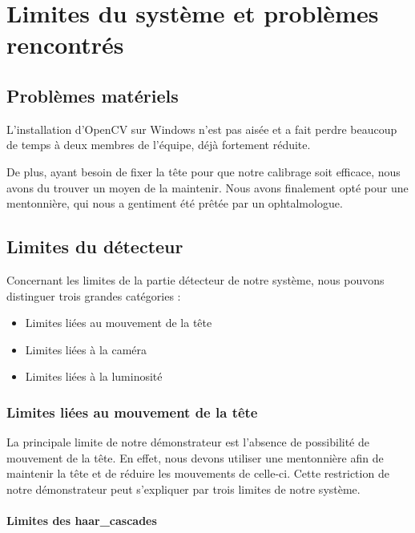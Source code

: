 \section{Limites du système et problèmes rencontrés}

\subsection{Problèmes matériels}
L'installation d'OpenCV sur Windows n'est pas aisée et a fait perdre beaucoup de temps à deux membres de l'équipe, déjà fortement réduite.

De plus, ayant besoin de fixer la tête pour que notre calibrage soit efficace, nous avons du trouver un moyen de la maintenir. Nous avons finalement opté pour une mentonnière, qui nous a gentiment été prêtée par un ophtalmologue.

\subsection{Limites du détecteur}

Concernant les limites de la partie détecteur de notre système, nous pouvons distinguer trois grandes catégories :
\begin{itemize}[font=\tiny, label=]
\item Limites liées au mouvement de la tête
\item Limites liées à la caméra
\item Limites liées à la luminosité
\end{itemize}

\subsubsection{Limites liées au mouvement de la tête}

La principale limite de notre démonstrateur est l’absence de possibilité de mouvement de la tête. En effet, nous devons utiliser une mentonnière afin de maintenir la tête et de réduire les mouvements de celle-ci. Cette restriction de notre démonstrateur peut s’expliquer par trois limites de notre système.

\paragraph{Limites des haar\_cascades}

